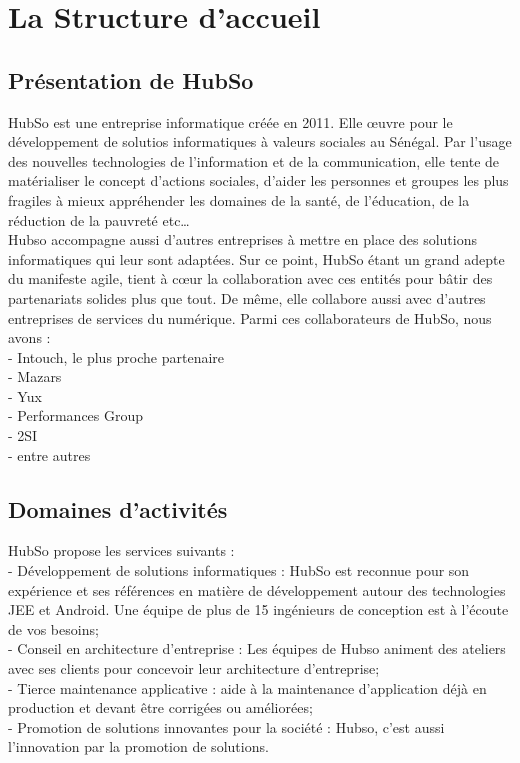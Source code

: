 \chapter{La Structure d'accueil}

\section{Présentation de HubSo}

HubSo est une entreprise informatique créée en 2011. Elle œuvre pour le développement de solutios informatiques à valeurs sociales au Sénégal. Par l’usage des nouvelles technologies de l'information et de la communication, elle tente de matérialiser le concept d’actions sociales, d’aider les personnes et groupes les plus fragiles à mieux appréhender les domaines de la santé, de l’éducation, de la réduction de la pauvreté etc… \\
Hubso accompagne aussi d'autres entreprises à mettre en place des solutions informatiques qui leur sont adaptées. Sur ce point, HubSo étant un grand adepte du manifeste agile, tient à cœur la collaboration avec ces entités pour bâtir des partenariats solides plus que tout. De même, elle collabore aussi avec d'autres entreprises de services du numérique. Parmi ces collaborateurs de HubSo, nous avons : \\
- Intouch, le plus proche partenaire \\
- Mazars \\ 
- Yux \\
- Performances Group \\
- 2SI \\
- entre autres

\section{Domaines d'activités}

HubSo propose les services suivants : \\
- Développement de solutions informatiques : HubSo est reconnue pour son expérience et ses références en matière de développement autour des technologies JEE et Android. Une équipe de plus de 15 ingénieurs de conception est à l'écoute de vos besoins; \\
- Conseil en architecture d'entreprise : Les équipes de Hubso animent des ateliers avec ses clients  pour concevoir leur architecture d'entreprise; \\
- Tierce maintenance applicative : aide à la maintenance d'application déjà en production et devant être corrigées ou améliorées; \\
- Promotion de solutions innovantes pour la société : Hubso, c'est aussi l'innovation par la promotion de solutions.\\

